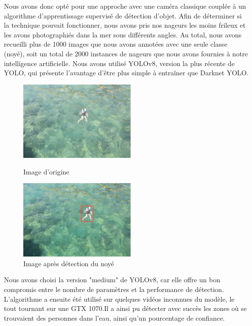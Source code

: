 \documentclass[a4paper,12pt,french]{report}
\begin{document}
Nous avons donc opté pour une approche avec une caméra classique couplée à un algorithme d'apprentissage supervisé de détection d'objet. Afin de déterminer si la technique pouvait fonctionner, nous avons pris nos nageurs les moins frileux et les avons photographiés dans la mer sous différents angles. Au total, nous avons recueilli plus de 1000 images que nous avons annotées avec une seule classe (noyé), soit un total de 2000 instances de nageurs que nous avons fournies à notre intelligence artificielle. Nous avons utilisé YOLOv8, version la plus récente de YOLO, qui présente l'avantage d'être plus simple à entraîner que Darknet YOLO.
\bigskip
\begin{figure}[h]
    \begin{minipage}{0.5\textwidth}
        \centering
        \includegraphics[height=4cm]{figures/vid.png}
        \caption{Image d'origine}
        \label{image}
    \end{minipage}%
    \begin{minipage}{0.5\textwidth}
        \centering
        \includegraphics[height=4cm]{figures/det.png}
        \caption{Image après détection du noyé}
        \label{detect}
    \end{minipage}
\end{figure}

Nous avons choisi la version "medium" de YOLOv8, car elle offre un bon compromis entre le nombre de paramètres et la performance de détection. \newline
L'algorithme a ensuite été utilisé sur quelques vidéos inconnues du modèle, le tout tournant sur une GTX 1070.Il a ainsi pu détecter avec succès les zones où se trouvaient des personnes dans l'eau, ainsi qu'un pourcentage de confiance.\newline
\end{document}
